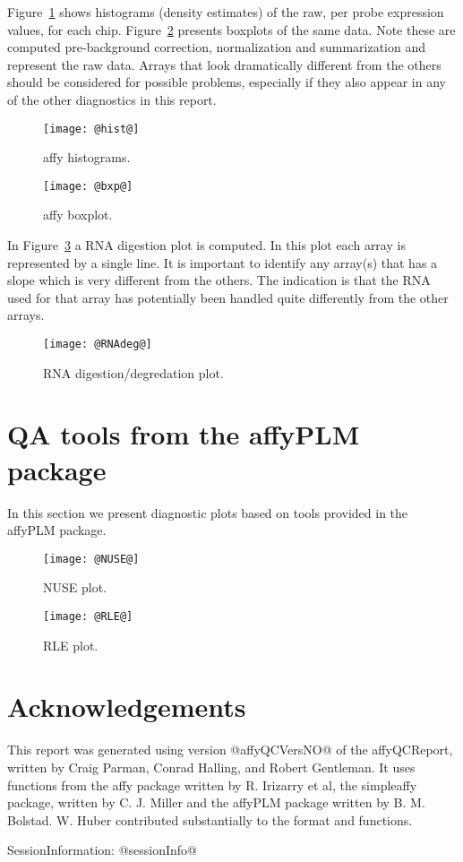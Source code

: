\documentclass[11pt]{article}
\newcommand{\Rpackage}[1]{{\textsf{#1}}}
\begin{document}
Figure~\ref{fig:hist} shows histograms (density estimates) of the raw, 
per probe expression values, for each chip. Figure~\ref{fig:bxp}
presents boxplots of the same data.  Note these are computed pre-background
correction, normalization and summarization and represent the raw
data. Arrays that look dramatically different from the others should be 
considered for possible problems, especially if they also appear in any
of the other diagnostics in this report.

\begin{figure}[tp]
  \centering
\texttt{[image: @hist@]}
\caption{\label{fig:hist}%
affy histograms.}
\end{figure}

\begin{figure}[tp]
  \centering
\texttt{[image: @bxp@]}
\caption{\label{fig:bxp}%
affy boxplot.}
\end{figure}


In Figure~\ref{fig:rnadeg} a RNA digestion plot is computed. In this plot
each array is represented by a single line. It is important to identify 
any array(s) that has a slope which is very different from the others. 
The indication is that the RNA used for that array has potentially 
been handled quite differently from the other arrays. 

\begin{figure}[tp]
  \centering
\texttt{[image: @RNAdeg@]}
\caption{\label{fig:rnadeg}%
RNA digestion/degredation plot.}
\end{figure}

\section{QA tools from the \Rpackage{affyPLM} package}

In this section we present diagnostic plots based on tools provided
in the \Rpackage{affyPLM} package.

\begin{figure}[tp]
  \centering
\texttt{[image: @NUSE@]}
\caption{\label{fig:NUSE}%
NUSE plot.}
\end{figure}

\begin{figure}[tp]
  \centering
\texttt{[image: @RLE@]}
\caption{\label{fig:RLE}%
RLE plot.}
\end{figure}

\section*{Acknowledgements}
\label{sec:ack}

This report was generated using version @affyQCVersNO@ of the 
\Rpackage{affyQCReport}, written by Craig Parman, Conrad Halling, and
Robert Gentleman. It uses functions from the \Rpackage{affy} package
written by R. Irizarry et al, the \Rpackage{simpleaffy} package, written
by C. J. Miller and the \Rpackage{affyPLM} package written by B. M. Bolstad.
W. Huber contributed substantially to the format and functions.

SessionInformation: 
@sessionInfo@
\end{document}
